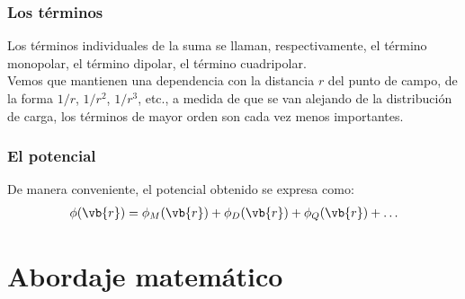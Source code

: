 \begin{frame}
\frametitle{Los términos}
Los términos individuales de la suma se llaman, respectivamente, el término monopolar, el término dipolar, el término cuadripolar.
\\
\bigskip
\pause
Vemos que mantienen una dependencia con la distancia $r$ del punto de campo, de la forma $1/r$, $1/r^{2}$, $1/r^{3}$, etc., a medida de que se van alejando de la distribución de carga, los términos de mayor orden son cada vez menos importantes.
\end{frame}
\begin{frame}
\frametitle{El potencial}
De manera conveniente, el potencial obtenido se expresa como:
\begin{align}
\phi(\vb{r}) = \phi_{M}(\vb{r}) + \phi_{D}(\vb{r}) + \phi_{Q}(\vb{r}) + \ldots
\label{eq:ecuacion_08_08}
\end{align}
\end{frame}
\section{Abordaje matemático}
